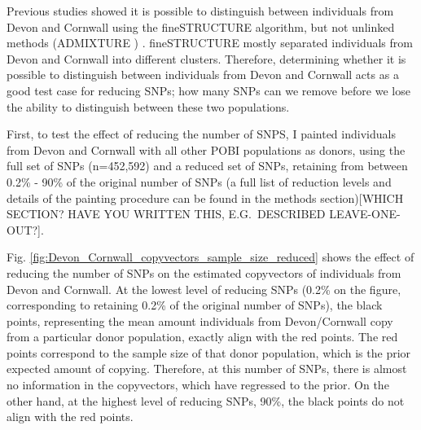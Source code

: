 Previous studies showed it is possible to distinguish between individuals from Devon and Cornwall using the fineSTRUCTURE algorithm, but not unlinked methods (ADMIXTURE \cite{alexander2009fast}) \cite{Leslie2015}. fineSTRUCTURE mostly separated individuals from Devon and Cornwall into different clusters. Therefore, determining whether it is possible to distinguish between individuals from Devon and Cornwall acts as a good test case for reducing SNPs; how many SNPs can we remove before we lose the ability to distinguish between these two populations. 

First, to test the effect of reducing the number of SNPS, I painted individuals from Devon and Cornwall with all other POBI populations as donors, using the full set of SNPs (n=452,592) and a reduced set of SNPs, retaining from between 0.2\% - 90\% of the original number of SNPs (a full list of reduction levels and details of the painting procedure can be found in the methods section){\color{red}[WHICH SECTION? HAVE YOU WRITTEN THIS, E.G.\ DESCRIBED LEAVE-ONE-OUT?]}. 

Fig. \ref{fig:Devon_Cornwall_copyvectors_sample_size_reduced} shows the effect of reducing the number of SNPs on the estimated copyvectors of individuals from Devon and Cornwall. At the lowest level of reducing SNPs (0.2\% on the figure, corresponding to retaining 0.2\% of the original number of SNPs), the black points, representing the mean amount individuals from Devon/Cornwall copy from a particular donor population, exactly align with the red points. The red points correspond to the sample size of that donor population, which is the prior expected amount of copying. Therefore, at this number of SNPs, there is almost no information in the copyvectors, which have regressed to the prior. On the other hand, at the highest level of reducing SNPs, 90\%, the black points do not align with the red points. 

